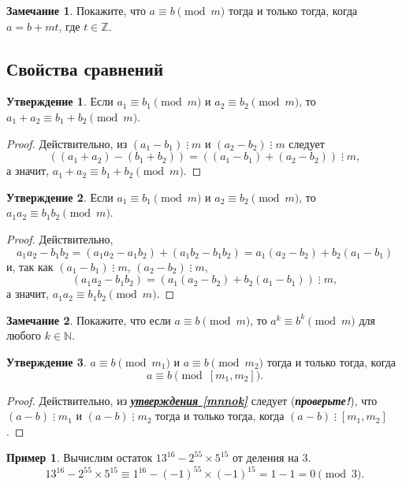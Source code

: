 \documentclass[14pt, a4paper]{extarticle}
\theoremstyle{definition}
\newtheorem*{remark}{Замечание}
\newtheorem{example}{Пример}
\newtheorem{statement}{Утверждение}
\newcommand{\divisible}{\mathop{\vdots}}
\begin{document}
	\begin{remark}
		Покажите, что $a\equiv b\pmod{m}$ тогда и только тогда, когда $a=b+mt$, где $t\in\mathbb{Z}$.
	\end{remark}

\subsection{Свойства сравнений}
\label{prop}

	\begin{statement}
		Если $a_1\equiv b_1\pmod{m}$ и $a_2\equiv b_2\pmod{m}$, то $a_1+a_2\equiv b_1+b_2\pmod{m}$.
	\end{statement}
	\begin{proof}
		Действительно, из $(a_1-b_1)\divisible m$ и $(a_2-b_2)\divisible m$ следует $$((a_1+a_2)-(b_1+b_2))=((a_1-b_1)+(a_2-b_2))\divisible m,$$ а значит, $a_1+a_2\equiv b_1+b_2\pmod{m}$.
	\end{proof}

	\begin{statement}
	\label{mult}
		Если $a_1\equiv b_1\pmod{m}$ и $a_2\equiv b_2\pmod{m}$, то $a_1a_2\equiv b_1b_2\pmod{m}$.
	\end{statement}
	\begin{proof}
		Действительно, $$a_1a_2-b_1b_2=(a_1a_2-a_1b_2)+(a_1b_2-b_1b_2)=a_1(a_2-b_2)+b_2(a_1-b_1)$$ и, так как $(a_1-b_1)\divisible m$, $(a_2-b_2)\divisible m$, $$(a_1a_2-b_1b_2)=(a_1(a_2-b_2)+b_2(a_1-b_1))\divisible m,$$ а значит, $a_1a_2\equiv b_1b_2\pmod{m}$.
	\end{proof}

	\begin{remark}
		Покажите, что если $a\equiv b\pmod{m}$, то $a^k\equiv b^k\pmod{m}$ для любого $k\in\mathbb{N}$.
	\end{remark}

	\begin{statement}
		$a\equiv b\pmod{m_1}$ и $a\equiv b\pmod{m_2}$ тогда и только тогда, когда $$a\equiv b\pmod{[m_1,m_2]}.$$
	\end{statement}
	\begin{proof}
		Действительно, из \hyperref[mnnok]{\textbf{\textit{утверждения \ref*{mnnok}}}} следует (\textbf{\textit{про\-верьте!}}), что $(a-b)\divisible m_1$ и $(a-b)\divisible m_2$ тогда и только тогда, когда $(a-b)\divisible[m_1,m_2]$.
	\end{proof}

	\begin{example}
		Вычислим остаток $13^{16}-2^{55}\times5^{15}$ от деления на $3$.
		$$13^{16}-2^{55}\times5^{15}\equiv1^{16}-(-1)^{55}\times(-1)^{15}=1-1=0\pmod{3}.$$
	\end{example}
\end{document}
